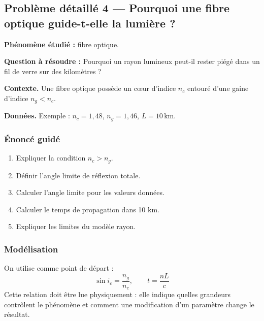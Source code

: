 \documentclass[11pt,a4paper]{article}
\begin{document}
\subsection{Problème détaillé 4 — Pourquoi une fibre optique guide-t-elle la lumière ?}

\begin{exercicebox}
\textbf{Phénomène étudié :} fibre optique.

\medskip
\textbf{Question à résoudre :} Pourquoi un rayon lumineux peut-il rester piégé dans un fil de verre sur des kilomètres ?

\medskip
\textbf{Contexte.} Une fibre optique possède un cœur d'indice \(n_c\) entouré d'une gaine d'indice \(n_g<n_c\).

\medskip
\textbf{Données.} Exemple : \(n_c=1{,}48\), \(n_g=1{,}46\), \(L=10\,\mathrm{km}\).
\end{exercicebox}

\subsubsection*{Énoncé guidé}

\begin{enumerate}
  \item Expliquer la condition \(n_c>n_g\).
  \item Définir l'angle limite de réflexion totale.
  \item Calculer l'angle limite pour les valeurs données.
  \item Calculer le temps de propagation dans 10 km.
  \item Expliquer les limites du modèle rayon.
\end{enumerate}

\subsubsection*{Modélisation}

\begin{theorembox}
On utilise comme point de départ :
\[
\sin i_c=\frac{n_g}{n_c},\qquad t=\frac{nL}{c}
\]
Cette relation doit être lue physiquement : elle indique quelles grandeurs contrôlent le phénomène et comment une modification d'un paramètre change le résultat.
\end{theorembox}
\end{document}
